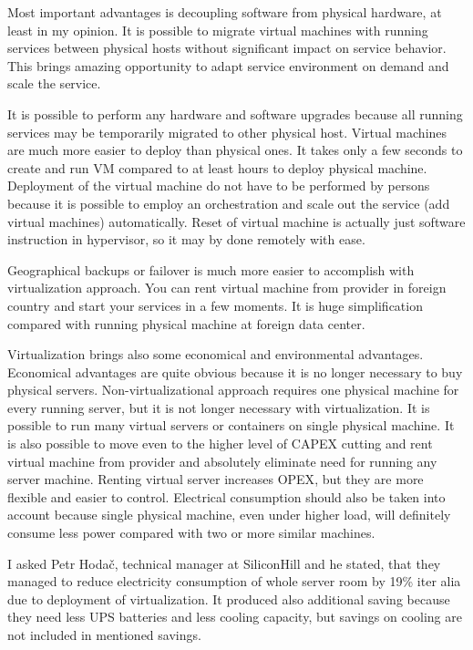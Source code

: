 
Most important advantages is decoupling software from physical hardware, at least in my opinion. It is possible to migrate virtual machines with running services between physical hosts without significant impact on service behavior. This brings amazing opportunity to adapt service environment on demand and scale the service.

It is possible to perform any hardware and software upgrades because all running services may be temporarily migrated to other physical host. Virtual machines are much more easier to deploy than physical ones. It takes only a few seconds to create and run \Ac{VM} compared to at least hours to deploy physical machine. Deployment of the virtual machine do not have to be performed by persons because it is possible to employ an orchestration and scale out the service (add virtual machines) automatically.
Reset of virtual machine is actually just software instruction in hypervisor, so it may by done remotely with ease.

Geographical backups or failover is much more easier to accomplish with virtualization approach. You can rent virtual machine from provider in foreign country and start your services in a few moments. It is huge simplification compared with running physical machine at foreign data center.

Virtualization brings also some economical and environmental advantages. Economical advantages are quite obvious because it is no longer necessary to buy physical servers. Non-virtualizational approach requires one physical machine for every running server, but it is not longer necessary with virtualization. It is possible to run many virtual servers or containers on single physical machine. It is also possible to move even to the higher level of \Ac{CAPEX} cutting and rent virtual machine from provider and absolutely eliminate need for running any server machine. Renting virtual server increases \Ac{OPEX}, but they are more flexible and easier to control.
Electrical consumption should also be taken into account because single physical machine, even under higher load, will definitely consume less power compared with two or more similar machines. 

I asked Petr Hodač, technical manager at SiliconHill and he stated, that they managed to reduce electricity consumption of whole server room by 19\% iter alia due to deployment of virtualization. It produced also additional saving because they need less \Ac{UPS} batteries and less cooling capacity, but savings on cooling are not included in mentioned savings.

